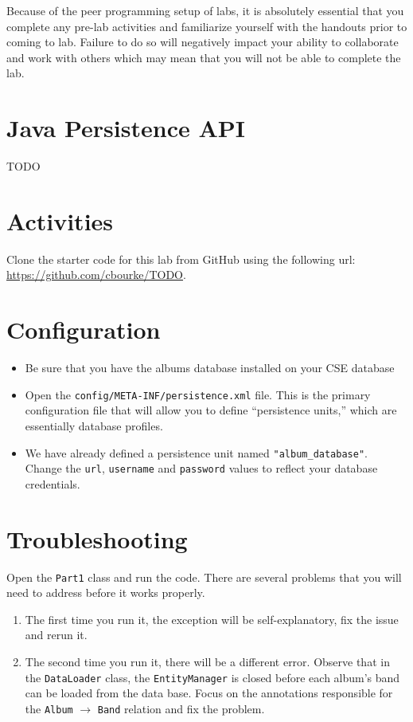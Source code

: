 \documentclass[12pt]{scrartcl}
\begin{document}
Because of the peer programming setup of labs, it is absolutely 
essential that you complete any pre-lab activities and familiarize
yourself with the handouts prior to coming to lab.  Failure to do
so will negatively impact your ability to collaborate and work with 
others which may mean that you will not be able to complete the
lab.  

\section*{Java Persistence API}

TODO

\section*{Activities}

Clone the starter code for this lab from GitHub using the following
url: \url{https://github.com/cbourke/TODO}.

\section*{Configuration}

\begin{itemize}
  \item Be sure that you have the albums database installed on your CSE 
    database
  \item Open the \texttt{config/META-INF/persistence.xml} file.
  	This is the primary configuration file that will allow you to define
	``persistence units,'' which are essentially database profiles.
  \item We have already defined a persistence unit named \texttt{"album_database"}.
    Change the \texttt{url}, \texttt{username} and
    \texttt{password} values to reflect your database 
    credentials.
\end{itemize}

\section*{Troubleshooting}

Open the \texttt{Part1} class and run the code.  There are several
problems that you will need to address before it works properly.

\begin{enumerate}
  \item The first time you run it, the exception will be self-explanatory, 
  	fix the issue and rerun it.
  \item The second time you run it, there will be a different error.  Observe
  	that in the \texttt{DataLoader} class, the \texttt{EntityManager}
	is closed before each album's band can be loaded from the data base.  Focus
	on the annotations responsible for the \texttt{Album} $\rightarrow$ 
	\texttt{Band} relation and fix the problem.
\end{enumerate}
\end{document}

